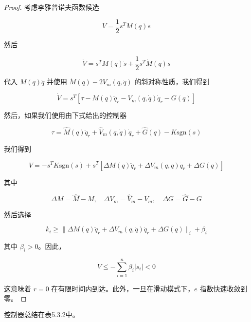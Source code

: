\documentclass[UTF8,12pt,a4paper]{ctexart}
\begin{document}
\begin{proof}
考虑李雅普诺夫函数候选

\begin{equation}
V = \frac{1}{2}s^T M(q)s
\end{equation}

然后

\begin{equation}
\dot{V} = s^T M(q)\dot{s} + \frac{1}{2}s^T \dot{M}(q)s
\end{equation}

代入 $M(q)\ddot{q}$ 并使用 $\dot{M}(q) - 2V_m(q, \dot{q})$ 的斜对称性质，我们得到

\begin{equation}
\dot{V} = s^T[\tau - M(q)\ddot{q}_r - V_m(q, \dot{q})\dot{q}_r - G(q)]
\end{equation}

然后，如果我们使用由下式给出的控制器

\begin{equation}
\tau = \hat{M}(q)\ddot{q}_r + \hat{V}_m(q, \dot{q})\dot{q}_r + \hat{G}(q) - K \text{sgn}(s)
\end{equation}

我们得到

\begin{equation}
\dot{V} = -s^T K \text{sgn}(s) + s^T[\Delta M(q)\ddot{q}_r + \Delta V_m(q, \dot{q})\dot{q}_r + \Delta G(q)]
\end{equation}

其中

\begin{equation}
\Delta M = \hat{M} - M, \quad \Delta V_m = \hat{V}_m - V_m, \quad \Delta G = \hat{G} - G
\end{equation}

然后选择

\begin{equation}
k_i \geq \|\Delta M(q)\ddot{q}_r + \Delta V_m(q, \dot{q})\dot{q}_r + \Delta G(q)\|_i + \beta_i
\end{equation}

其中 $\beta_i > 0$。因此，

\begin{equation}
\dot{V} \leq -\sum_{i=1}^{n}\beta_i|s_i| < 0
\end{equation}

这意味着 $r = 0$ 在有限时间内到达。此外，一旦在滑动模式下，$e$ 指数快速收敛到零。
\end{proof}

控制器总结在表5.3.2中。
\end{document}
